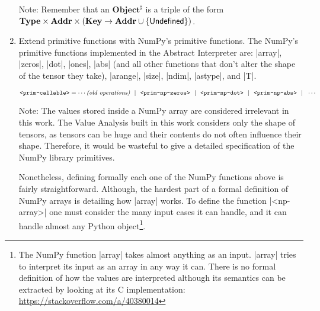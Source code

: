 \begin{enumerate}

  Note: Remember that an \(\mathbf{Object}^\sharp\) is a triple of the form
  \(\mathbf{Type} \times \mathbf{Addr} \times \left(\mathbf{Key} \to \mathbf{Addr} \cup \{\mathsf{Undefined}\}\right)\).

\item Extend primitive functions with NumPy's primitive functions. The NumPy's primitive
  functions implemented in the Abstract Interpreter are: \pycode|array|, \pycode|zeros|,
  \pycode|dot|, \pycode|ones|, \pycode|abs| (and all other functions that don't alter the
  shape of the tensor they take), \pycode|arange|, \pycode|size|, \pycode|ndim|,
  \pycode|astype|, and \pycode|T|.

  \vspace*{-1.3em}
  \[\texttt{<prim-callable>} = \cdots \textit{(old operations)} ~~|~~
                  \texttt{<prim-np-zeros>} ~~|~~ \texttt{<prim-np-dot>} ~~|~~
                  \texttt{<prim-np-abs>} ~~|~~ \cdots\]

  Note: The values stored inside a NumPy array are considered irrelevant in this work. The
  Value Analysis built in this work considers only the shape of tensors, as tensors can be
  huge and their contents do not often influence their shape. Therefore, it would be
  wasteful to give a detailed specification of the NumPy library primitives.

  Nonetheless, defining formally each one of the NumPy functions above is
  fairly straightforward. Although, the hardest part of a formal
  definition of NumPy arrays is detailing how \pycode|array| works. To
  define the function \pycode|<np-array>| one
  must consider the many input cases it can handle, and it can handle
  almost any Python object\footnote{The NumPy function \pycode|array|
    takes almost anything as an input. \pycode|array| tries to
    interpret its input as an array in any way it can. There is no
    formal definition of how the values are interpreted although its
    semantics can be extracted by looking at its C implementation:
    \url{https://stackoverflow.com/a/40380014}}.


\end{enumerate}
